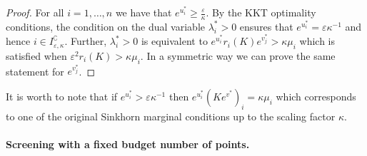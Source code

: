 \documentclass{article}
\begin{document}
\begin{proof}

For all $i=1, \ldots, n$ we have that $e^{u^{*}_i} \geq \frac \varepsilon\kappa$. By the KKT optimality conditions, the condition on the dual variable $\lambda^{*}_i > 0$  ensures that $e^{u^{*}_i} = \varepsilon\kappa^{-1}$ and hence $i \in I^\complement_{\varepsilon,\kappa}$. Further, $\lambda^{*}_i > 0$ is equivalent to $e^{u^{*}_i}r_i(K) e^{v^{*}_j} >  \kappa{\mu_i}$ which  is satisfied when $\varepsilon^2r_i(K) >  \kappa{\mu_i}.$  
In a symmetric way we can prove the same statement for $e^{v^{*}_j}$.
\end{proof}

It is worth to note that if $e^{u^{*}_i} > \varepsilon\kappa^{-1}$ then $e^{u^{*}_i} (Ke^{v^{*}})_i =  \kappa\mu_i$ which corresponds to one of the original Sinkhorn marginal conditions up to the scaling factor $\kappa$. 


\paragraph{Screening with a fixed budget number of points.}
\end{document}
